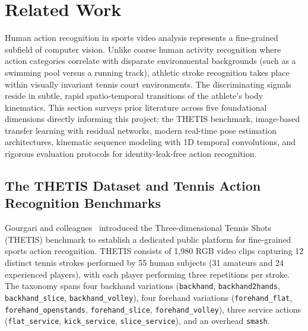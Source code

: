 \documentclass[12pt,a4paper]{article}
\begin{document}
\clearpage
\section{Related Work}
Human action recognition in sports video analysis represents a fine-grained subfield of computer vision. Unlike coarse human activity recognition where action categories correlate with disparate environmental backgrounds (such as a swimming pool versus a running track), athletic stroke recognition takes place within visually invariant tennis court environments. The discriminating signals reside in subtle, rapid spatio-temporal transitions of the athlete's body kinematics. This section surveys prior literature across five foundational dimensions directly informing this project: the THETIS benchmark, image-based transfer learning with residual networks, modern real-time pose estimation architectures, kinematic sequence modeling with 1D temporal convolutions, and rigorous evaluation protocols for identity-leak-free action recognition.

\subsection{The THETIS Dataset and Tennis Action Recognition Benchmarks}
Gourgari and colleagues~\cite{gourgari2013thetis} introduced the Three-dimensional Tennis Shots (THETIS) benchmark to establish a dedicated public platform for fine-grained sports action recognition. THETIS consists of 1,980 RGB video clips capturing 12 distinct tennis strokes performed by 55 human subjects (31 amateurs and 24 experienced players), with each player performing three repetitions per stroke. The taxonomy spans four backhand variations (\texttt{backhand}, \texttt{backhand2hands}, \texttt{backhand\_\allowbreak slice}, \texttt{backhand\_\allowbreak volley}), four forehand variations (\texttt{forehand\_flat}, \texttt{forehand\_\allowbreak openstands}, \texttt{forehand\_\allowbreak slice}, \texttt{forehand\_\allowbreak volley}), three service actions (\texttt{flat\_\allowbreak service}, \texttt{kick\_\allowbreak service}, \texttt{slice\_\allowbreak service}), and an overhead \texttt{smash}.
\end{document}

